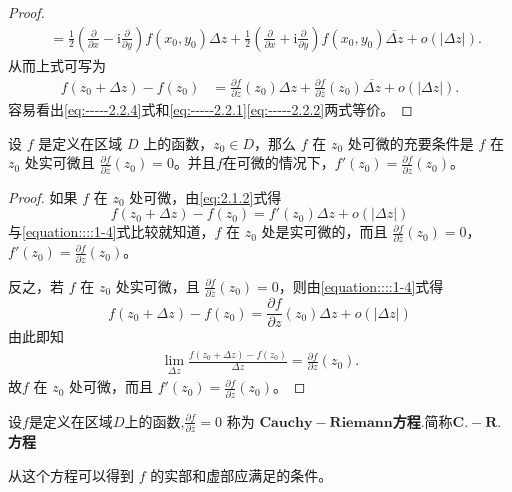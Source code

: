 \documentclass[../../main.tex]{subfiles}%
\begin{document}
\begin{proof}
\begin{align*}
&= \frac{1}{2}\left( \frac{\partial}{\partial x} - \text{i}\frac{\partial}{\partial y} \right)f(x_0, y_0)\Delta z + \frac{1}{2}\left( \frac{\partial}{\partial x} + \text{i}\frac{\partial}{\partial y} \right)f(x_0, y_0)\overline{\Delta z} + o(|\Delta z|).
\end{align*}
从而上式可写为
\begin{align}\label{eq:-----2.2.4}
f(z_0 + \Delta z) - f(z_0) &= \frac{\partial f}{\partial z}(z_0)\Delta z + \frac{\partial f}{\partial \overline{z}}(z_0)\overline{\Delta z} + o(|\Delta z|).
\end{align}
容易看出\eqref{eq:-----2.2.4}式和\eqref{eq:-----2.2.1}\eqref{eq:-----2.2.2}两式等价。
\end{proof}

\begin{theorem}\label{theorem:复变函数可微的充要条件1}
设 \( f \) 是定义在区域 \( D \) 上的函数，\( z_0 \in D \)，那么 \( f \) 在 \( z_0 \) 处可微的充要条件是 \( f \) 在 \( z_0 \) 处实可微且 \( \frac{\partial f}{\partial \overline{z}}(z_0) = 0 \)。并且$f$在可微的情况下，\( f'(z_0) = \frac{\partial f}{\partial z}(z_0) \)。
\end{theorem}
\begin{proof}
如果 \( f \) 在 \( z_0 \) 处可微，由\eqref{eq:2.1.2}式得
\[
f(z_0 + \Delta z) - f(z_0) = f'(z_0)\Delta z + o(|\Delta z|)
\]
与\eqref{equation::::1-4}式比较就知道，\( f \) 在 \( z_0 \) 处是实可微的，而且 \( \frac{\partial f}{\partial \overline{z}}(z_0) = 0 \)，\( f'(z_0) = \frac{\partial f}{\partial z}(z_0) \)。

反之，若 \( f \) 在 \( z_0 \) 处实可微，且 \( \frac{\partial f}{\partial \overline{z}}(z_0) = 0 \)，则由\eqref{equation::::1-4}式得
\[
f(z_0 + \Delta z) - f(z_0) = \frac{\partial f}{\partial z}(z_0)\Delta z + o(|\Delta z|)
\]
由此即知 
\begin{align*}
\underset{\Delta z}{\lim}\frac{f\left( z_0+\Delta z \right) -f\left( z_0 \right)}{\Delta z}=\frac{\partial f}{\partial z}\left( z_0 \right).
\end{align*}
故\( f \) 在 \( z_0 \) 处可微，而且 \( f'(z_0) = \frac{\partial f}{\partial z}(z_0) \)。
\end{proof}

\begin{definition}
设$f$是定义在区域$D$上的函数,$\frac{\partial f}{\partial \overline{z}} = 0$ 称为 $\mathbf{Cauchy}-\mathbf{Riemann}$\textbf{方程}.简称$\mathbf{C}.-\mathbf{R}.$\textbf{方程}
\end{definition}
\begin{note}
从这个方程可以得到 $f$ 的实部和虚部应满足的条件。
\end{note}
\end{document}
